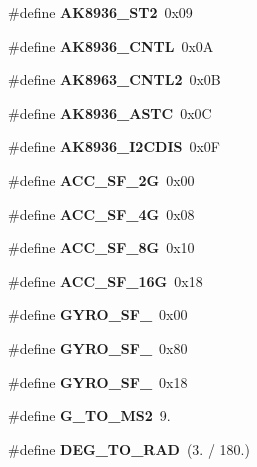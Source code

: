 \begin{DoxyCompactItemize}
\#define {\bfseries A\+K8936\+\_\+\+S\+T2}~0x09
\item 
\mbox{\label{_i_m_u__functions_8h_aaf1ccf81f01e11b6f97cbb1f56f9c31c}} 
\#define {\bfseries A\+K8936\+\_\+\+C\+N\+TL}~0x0A
\item 
\mbox{\label{_i_m_u__functions_8h_a22c3ba7c88d001a39b0f0d3c880c8993}} 
\#define {\bfseries A\+K8963\+\_\+\+C\+N\+T\+L2}~0x0B
\item 
\mbox{\label{_i_m_u__functions_8h_a951a7bb134f91b3966e4ab618a6db94d}} 
\#define {\bfseries A\+K8936\+\_\+\+A\+S\+TC}~0x0C
\item 
\mbox{\label{_i_m_u__functions_8h_a915e3e48f694500f0728e5c720134763}} 
\#define {\bfseries A\+K8936\+\_\+\+I2\+C\+D\+IS}~0x0F
\item 
\mbox{\label{_i_m_u__functions_8h_aba7d379977d1c4793eb8871c8ebc417a}} 
\#define {\bfseries A\+C\+C\+\_\+\+S\+F\+\_\+2G}~0x00
\item 
\mbox{\label{_i_m_u__functions_8h_ac9159339b9f5428ed16b7e794185e29f}} 
\#define {\bfseries A\+C\+C\+\_\+\+S\+F\+\_\+4G}~0x08
\item 
\mbox{\label{_i_m_u__functions_8h_ac9e0af9f1a9e4e07f306410e3c3a84d3}} 
\#define {\bfseries A\+C\+C\+\_\+\+S\+F\+\_\+8G}~0x10
\item 
\mbox{\label{_i_m_u__functions_8h_a08d2b56da01c25684a489faeb9a976e8}} 
\#define {\bfseries A\+C\+C\+\_\+\+S\+F\+\_\+16G}~0x18
\item 
\mbox{\label{_i_m_u__functions_8h_ae6de0bc596530ecf09f3da43529588d0}} 
\#define {\bfseries G\+Y\+R\+O\+\_\+\+S\+F\+\_}~0x00
\item 
\mbox{\label{_i_m_u__functions_8h_ad0973081208e9cfda92705d5f361446b}} 
\#define {\bfseries G\+Y\+R\+O\+\_\+\+S\+F\+\_}~0x80
\item 
\mbox{\label{_i_m_u__functions_8h_aa58d6861fcbbdc86f79c2920fbeafcc0}} 
\#define {\bfseries G\+Y\+R\+O\+\_\+\+S\+F\+\_}~0x18
\item 
\mbox{\label{_i_m_u__functions_8h_a1078273b65a944f3966c004fcbe7cb2c}} 
\#define {\bfseries G\+\_\+\+T\+O\+\_\+\+M\+S2}~9.
\item 
\mbox{\label{_i_m_u__functions_8h_a212460e743fecb084d717bb2180c5a56}} 
\#define {\bfseries D\+E\+G\+\_\+\+T\+O\+\_\+\+R\+AD}~(3. / 180.)
\end{DoxyCompactItemize}
